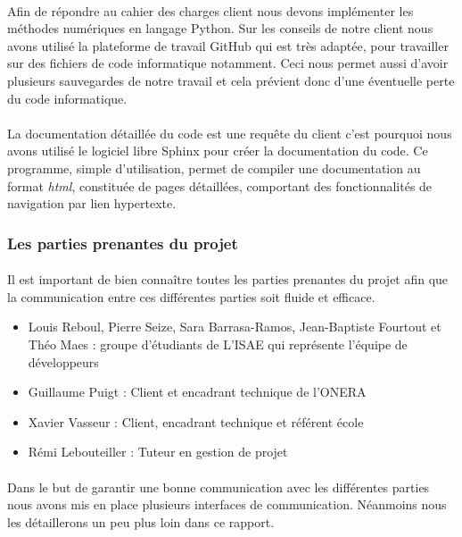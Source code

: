         \paragraph{}
        Afin de répondre au cahier des charges client nous devons implémenter les méthodes numériques en langage Python. Sur les conseils de notre client nous avons utilisé la plateforme de travail GitHub qui est très adaptée, pour travailler sur des fichiers de code informatique notamment. Ceci nous permet aussi d'avoir plusieurs sauvegardes de notre travail et cela prévient donc d'une éventuelle perte du code informatique.

        \paragraph{}
        La documentation détaillée du code est une requête du client c'est pourquoi nous avons utilisé le logiciel libre Sphinx pour créer la documentation du code. Ce programme, simple d'utilisation, permet de compiler une documentation au format \emph{html}, constituée de pages détaillées, comportant des fonctionnalités de navigation par lien hypertexte.

    \subsubsection{Les parties prenantes du projet}
        \paragraph{}
        Il est important de bien connaître toutes les parties prenantes du projet afin que la communication entre ces différentes parties soit fluide et efficace.
        \begin{itemize}
            \item Louis Reboul, Pierre Seize, Sara Barrasa-Ramos, Jean-Baptiste Fourtout et Théo Maes : groupe d'étudiants de L'ISAE qui représente l'équipe de développeurs
            \item Guillaume Puigt : Client et encadrant technique de l'ONERA
            \item Xavier Vasseur : Client, encadrant technique et référent école
            \item Rémi Lebouteiller : Tuteur en gestion de projet
        \end{itemize}

        \paragraph{}
        Dans le but de garantir une bonne communication avec les différentes parties nous avons mis en place plusieurs interfaces de communication. Néanmoins nous les détaillerons un peu plus loin dans ce rapport.

